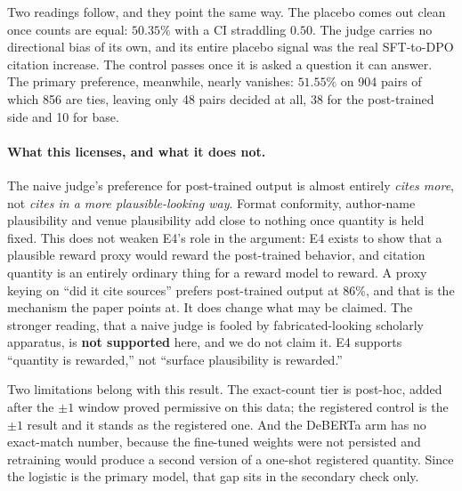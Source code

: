Two readings follow, and they point the same way. The placebo comes out clean
once counts are equal: $50.35\%$ with a CI straddling $0.50$. The judge carries
no directional bias of its own, and its entire placebo signal was the real
SFT-to-DPO citation increase. The control passes once it is asked a question it
can answer. The primary preference, meanwhile, nearly vanishes: $51.55\%$ on 904
pairs of which 856 are ties, leaving only 48 pairs decided at all, 38 for the
post-trained side and 10 for base.

\paragraph{What this licenses, and what it does not.}
The naive judge's preference for post-trained output is almost entirely
\emph{cites more}, not \emph{cites in a more plausible-looking way}. Format
conformity, author-name plausibility and venue plausibility add close to nothing
once quantity is held fixed. This does not weaken E4's role in the argument: E4
exists to show that a plausible reward proxy would reward the post-trained
behavior, and citation quantity is an entirely ordinary thing for a reward model
to reward. A proxy keying on ``did it cite sources'' prefers post-trained output
at 86\%, and that is the mechanism the paper points at. It does change what may
be claimed. The stronger reading, that a naive judge is fooled by
fabricated-looking scholarly apparatus, is \textbf{not supported} here, and we do
not claim it. E4 supports ``quantity is rewarded,'' not ``surface plausibility is
rewarded.''

Two limitations belong with this result. The exact-count tier is post-hoc, added
after the $\pm 1$ window proved permissive on this data; the registered control
is the $\pm 1$ result and it stands as the registered one. And the DeBERTa arm
has no exact-match number, because the fine-tuned weights were not persisted and
retraining would produce a second version of a one-shot registered quantity.
Since the logistic is the primary model, that gap sits in the secondary check
only.
